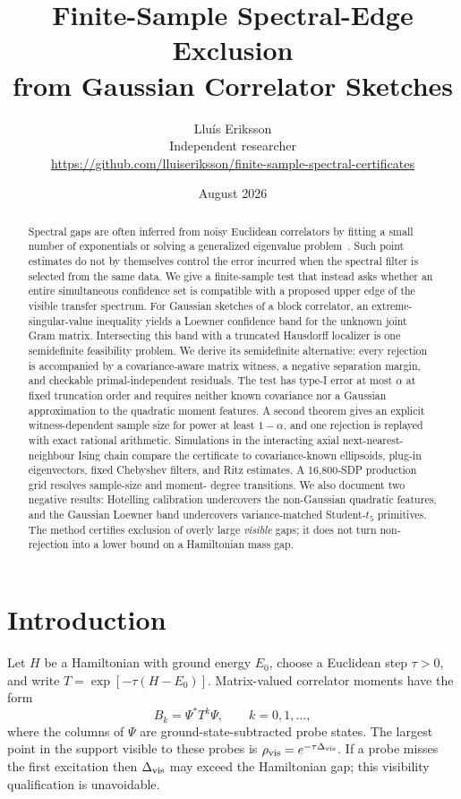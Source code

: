 \documentclass[11pt]{article}
\title{Finite-Sample Spectral-Edge Exclusion\\
from Gaussian Correlator Sketches}
\author{Lluís Eriksson\\
\small Independent researcher\\
\small \url{https://github.com/lluiseriksson/finite-sample-spectral-certificates}}
\date{August 2026}
\begin{document}
\maketitle

\begin{abstract}
Spectral gaps are often inferred from noisy Euclidean correlators by fitting a
small number of exponentials or solving a generalized eigenvalue
problem~\cite{Blossier2009}.  Such
point estimates do not by themselves control the error incurred when the
spectral filter is selected from the same data.  We give a finite-sample test
that instead asks whether an entire simultaneous confidence set is compatible
with a proposed upper edge of the visible transfer spectrum.  For Gaussian
sketches of a block correlator, an extreme-singular-value inequality yields a
Loewner confidence band for the unknown joint Gram matrix.  Intersecting this
band with a truncated Hausdorff localizer is one semidefinite feasibility
problem.  We derive its semidefinite alternative: every rejection is accompanied
by a covariance-aware matrix witness, a negative separation margin, and
checkable primal-independent residuals.  The test has type-I error at most
$\alpha$ at fixed truncation order and requires neither known covariance nor a
Gaussian approximation to the quadratic moment features.  A second theorem
gives an explicit witness-dependent sample size for power at least
$1-\alpha$, and one rejection is replayed with exact rational arithmetic.
Simulations in the
interacting axial next-nearest-neighbour Ising chain compare the certificate to
covariance-known ellipsoids, plug-in eigenvectors, fixed Chebyshev filters, and
Ritz estimates.  A 16,800-SDP production grid resolves sample-size and moment-
degree transitions.  We also document two negative results: Hotelling
calibration undercovers the non-Gaussian quadratic features, and the Gaussian
Loewner band undercovers variance-matched Student-$t_5$ primitives.  The method
certifies exclusion of overly large \emph{visible} gaps; it
does not turn non-rejection into a lower bound on a Hamiltonian mass gap.
\end{abstract}

\section{Introduction}

Let $H$ be a Hamiltonian with ground energy $E_0$, choose a Euclidean step
$\tau>0$, and write $T=\exp[-\tau(H-E_0)]$.  Matrix-valued correlator moments
have the form
\begin{equation}
  B_k=\Psi^*T^k\Psi,\qquad k=0,1,\ldots,
  \label{eq:moments}
\end{equation}
where the columns of $\Psi$ are ground-state-subtracted probe states.  The
largest point in the support visible to these probes is
$\rho_{\rm vis}=e^{-\tau\Delta_{\rm vis}}$.  If a probe misses the first
excitation then $\Delta_{\rm vis}$ may exceed the Hamiltonian gap; this
visibility qualification is unavoidable.
\end{document}
